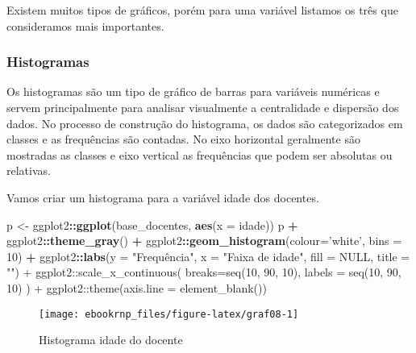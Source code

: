 \documentclass[11pt,]{style/krantz}
\makeatletter
\newenvironment{Shaded}{\begin{snugshade}}{\end{snugshade}}
\newcommand{\DataTypeTok}[1]{\textcolor[rgb]{0.13,0.29,0.53}{#1}}
\newcommand{\DecValTok}[1]{\textcolor[rgb]{0.00,0.00,0.81}{#1}}
\newcommand{\KeywordTok}[1]{\textcolor[rgb]{0.13,0.29,0.53}{\textbf{#1}}}
\newcommand{\NormalTok}[1]{#1}
\newcommand{\OperatorTok}[1]{\textcolor[rgb]{0.81,0.36,0.00}{\textbf{#1}}}
\newcommand{\StringTok}[1]{\textcolor[rgb]{0.31,0.60,0.02}{#1}}
\newenvironment{kframe}{%
\medskip{}
\setlength{\fboxsep}{.8em}
 \def\at@end@of@kframe{}%
 \ifinner\ifhmode%
  \def\at@end@of@kframe{\end{minipage}}%
  \begin{minipage}{\columnwidth}%
 \fi\fi%
 \def\FrameCommand##1{\hskip\@totalleftmargin \hskip-\fboxsep
 \colorbox{shadecolor}{##1}\hskip-\fboxsep
     \hskip-\linewidth \hskip-\@totalleftmargin \hskip\columnwidth}%
 \MakeFramed {\advance\hsize-\width
   \@totalleftmargin\z@ \linewidth\hsize
   \@setminipage}}%
 {\par\unskip\endMakeFramed%
 \at@end@of@kframe}
\renewenvironment{Shaded}{\begin{kframe}}{\end{kframe}}
\theoremstyle{definition}
\theoremstyle{definition}
\theoremstyle{definition}
\theoremstyle{remark}
\let\BeginKnitrBlock\begin \let\EndKnitrBlock\end
\makeatother
\begin{document}
Existem muitos tipos de gráficos, porém para uma variável listamos os três que consideramos mais importantes.

\hypertarget{histogramas}{%
\subsubsection{Histogramas}\label{histogramas}}

Os histogramas são um tipo de gráfico de barras para variáveis numéricas e servem principalmente para analisar visualmente a centralidade e dispersão dos dados. No processo de construção do histograma, os dados são categorizados em classes e as frequências são contadas. No eixo horizontal geralmente são mostradas as classes e eixo vertical as frequências que podem ser absolutas ou relativas.

\BeginKnitrBlock{example}
\protect\hypertarget{exm:unnamed-chunk-76}{}{\label{exm:unnamed-chunk-76} }Vamos criar um histograma para a variável idade dos docentes.
\EndKnitrBlock{example}

\begin{Shaded}
\begin{Highlighting}[]
\NormalTok{p <-}\StringTok{ }\NormalTok{ggplot2}\OperatorTok{::}\KeywordTok{ggplot}\NormalTok{(base_docentes, }\KeywordTok{aes}\NormalTok{(}\DataTypeTok{x =}\NormalTok{ idade))}
\NormalTok{p }\OperatorTok{+}\StringTok{ }\NormalTok{ggplot2}\OperatorTok{::}\KeywordTok{theme_gray}\NormalTok{() }\OperatorTok{+}
\StringTok{  }\NormalTok{ggplot2}\OperatorTok{::}\KeywordTok{geom_histogram}\NormalTok{(}\DataTypeTok{colour=}\StringTok{'white'}\NormalTok{, }\DataTypeTok{bins =} \DecValTok{10}\NormalTok{) }\OperatorTok{+}
\StringTok{  }\NormalTok{ggplot2}\OperatorTok{::}\KeywordTok{labs}\NormalTok{(}\DataTypeTok{y =} \StringTok{"Frequência", x = "}\NormalTok{Faixa de idade}\StringTok{", }
\StringTok{                fill = NULL, title = "") +}
\StringTok{    ggplot2::scale_x_continuous(}
\StringTok{      breaks=seq(10, 90, 10),}
\StringTok{      labels = seq(10, 90, 10)}
\StringTok{    ) +}
\StringTok{  ggplot2::theme(axis.line = element_blank())}
\end{Highlighting}
\end{Shaded}

\begin{figure}[H]

{\centering \texttt{[image: ebookrnp\_files/figure-latex/graf08-1]} 

}

\caption{Histograma idade do docente}\label{fig:graf08}
\end{figure}
\end{document}

